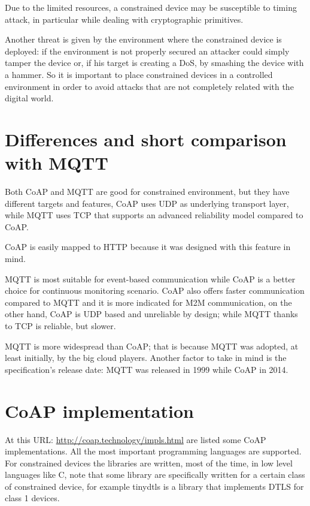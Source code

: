 	Due to the limited resources, a constrained device may be susceptible to timing attack, in particular while dealing with cryptographic primitives.\newline
	
	Another threat is given by the environment where the constrained device is deployed: if the environment is not properly secured an attacker could simply tamper the device or, if his target is creating a DoS, by smashing the device with a hammer.\newline
	So it is important to place constrained devices in a controlled environment in order to avoid attacks that are not completely related with the digital world.\newline
	
	\section{Differences and short comparison with MQTT}\label{sc:differences}
	Both CoAP and MQTT are good for constrained environment, but they have different targets and features, CoAP uses UDP as underlying transport layer, while MQTT uses TCP that supports an advanced reliability model compared to CoAP.\newline
	
	CoAP is easily mapped to HTTP because it was designed with this feature in mind.\newline
	
	MQTT is most suitable for event-based communication while CoAP is a better choice for continuous monitoring scenario.\newline
	CoAP also offers faster communication compared to MQTT and it is more indicated for M2M communication, on the other hand, CoAP is UDP based and unreliable by design; while MQTT thanks to TCP is reliable, but slower.\newline
	
	MQTT is more widespread than CoAP; that is because MQTT was adopted, at least initially, by the big cloud players.\newline
	Another factor to take in mind is the specification's release date: MQTT was released in 1999 while CoAP in 2014.\newline
	
	\section{CoAP implementation}\label{sc:coap_impl}
	At this URL: \url{http://coap.technology/impls.html} are listed some CoAP implementations.\newline
	All the most important programming languages are supported.\newline
	For constrained devices the libraries are written, most of the time, in low level languages like C, note that some library are specifically written for a certain class of constrained device, for example tinydtls is a library that implements DTLS for class 1 devices.\newline
	
